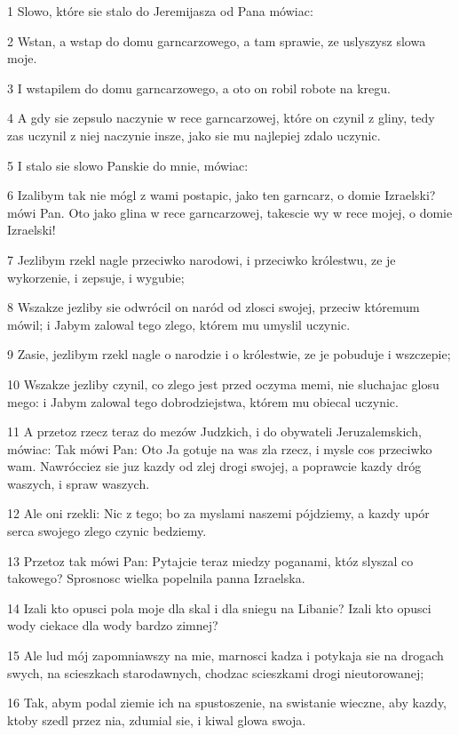\par 1 Slowo, które sie stalo do Jeremijasza od Pana mówiac:
\par 2 Wstan, a wstap do domu garncarzowego, a tam sprawie, ze uslyszysz slowa moje.
\par 3 I wstapilem do domu garncarzowego, a oto on robil robote na kregu.
\par 4 A gdy sie zepsulo naczynie w rece garncarzowej, które on czynil z gliny, tedy zas uczynil z niej naczynie insze, jako sie mu najlepiej zdalo uczynic.
\par 5 I stalo sie slowo Panskie do mnie, mówiac:
\par 6 Izalibym tak nie mógl z wami postapic, jako ten garncarz, o domie Izraelski? mówi Pan. Oto jako glina w rece garncarzowej, takescie wy w rece mojej, o domie Izraelski!
\par 7 Jezlibym rzekl nagle przeciwko narodowi, i przeciwko królestwu, ze je wykorzenie, i zepsuje, i wygubie;
\par 8 Wszakze jezliby sie odwrócil on naród od zlosci swojej, przeciw któremum mówil; i Jabym zalowal tego zlego, którem mu umyslil uczynic.
\par 9 Zasie, jezlibym rzekl nagle o narodzie i o królestwie, ze je pobuduje i wszczepie;
\par 10 Wszakze jezliby czynil, co zlego jest przed oczyma memi, nie sluchajac glosu mego: i Jabym zalowal tego dobrodziejstwa, którem mu obiecal uczynic.
\par 11 A przetoz rzecz teraz do mezów Judzkich, i do obywateli Jeruzalemskich, mówiac: Tak mówi Pan: Oto Ja gotuje na was zla rzecz, i mysle cos przeciwko wam. Nawrócciez sie juz kazdy od zlej drogi swojej, a poprawcie kazdy dróg waszych, i spraw waszych.
\par 12 Ale oni rzekli: Nic z tego; bo za myslami naszemi pójdziemy, a kazdy upór serca swojego zlego czynic bedziemy.
\par 13 Przetoz tak mówi Pan: Pytajcie teraz miedzy poganami, któz slyszal co takowego? Sprosnosc wielka popelnila panna Izraelska.
\par 14 Izali kto opusci pola moje dla skal i dla sniegu na Libanie? Izali kto opusci wody ciekace dla wody bardzo zimnej?
\par 15 Ale lud mój zapomniawszy na mie, marnosci kadza i potykaja sie na drogach swych, na scieszkach starodawnych, chodzac scieszkami drogi nieutorowanej;
\par 16 Tak, abym podal ziemie ich na spustoszenie, na swistanie wieczne, aby kazdy, ktoby szedl przez nia, zdumial sie, i kiwal glowa swoja.
